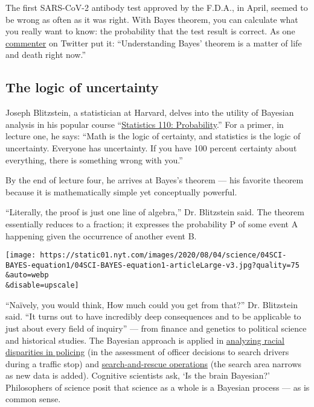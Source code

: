 The first SARS-CoV-2 antibody test approved by the F.D.A., in April,
seemed to be wrong as often as it was right. With Bayes theorem, you can
calculate what you really want to know: the probability that the test
result is correct. As one
\href{https://twitter.com/Riderius/status/1246172832071135236}{commenter}
on Twitter put it: ``Understanding Bayes' theorem is a matter of life
and death right now.''

\hypertarget{the-logic-of-uncertainty}{%
\subsection{The logic of uncertainty}\label{the-logic-of-uncertainty}}

Joseph Blitzstein, a statistician at Harvard, delves into the utility of
Bayesian analysis in his popular course
``\href{https://www.youtube.com/playlist?list=PL2SOU6wwxB0uwwH80KTQ6ht66KWxbzTIo}{Statistics
110: Probability}.'' For a primer, in lecture one, he says: ``Math is
the logic of certainty, and statistics is the logic of uncertainty.
Everyone has uncertainty. If you have 100 percent certainty about
everything, there is something wrong with you.''

By the end of lecture four, he arrives at Bayes's theorem --- his
favorite theorem because it is mathematically simple yet conceptually
powerful.

``Literally, the proof is just one line of algebra,'' Dr. Blitzstein
said. The theorem essentially reduces to a fraction; it expresses the
probability P of some event A happening given the occurrence of another
event B.

\texttt{[image: https://static01.nyt.com/images/2020/08/04/science/04SCI-BAYES-equation1/04SCI-BAYES-equation1-articleLarge-v3.jpg?quality=75\\\&auto=webp\\\&disable=upscale]}

``Naïvely, you would think, How much could you get from that?'' Dr.
Blitzstein said. ``It turns out to have incredibly deep consequences and
to be applicable to just about every field of inquiry'' --- from finance
and genetics to political science and historical studies. The Bayesian
approach is applied in
\href{https://www.nature.com/articles/s41562-020-0858-1}{analyzing
racial disparities in policing} (in the assessment of officer decisions
to search drivers during a traffic stop) and
\href{https://www.nytimes.com/2014/09/30/science/the-odds-continually-updated.html}{search-and-rescue
operations} (the search area narrows as new data is added). Cognitive
scientists ask, `Is the brain Bayesian?' Philosophers of science posit
that science as a whole is a Bayesian process --- as is common sense.

